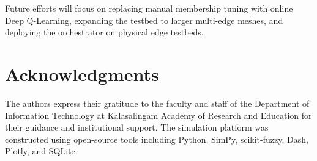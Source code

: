 \documentclass[conference]{IEEEtran}
\begin{document}
Future efforts will focus on replacing manual membership tuning with online Deep Q-Learning, expanding the testbed to larger multi-edge meshes, and deploying the orchestrator on physical edge testbeds.

\section*{Acknowledgments}
The authors express their gratitude to the faculty and staff of the Department of Information Technology at Kalasalingam Academy of Research and Education for their guidance and institutional support. The simulation platform was constructed using open-source tools including Python, SimPy, scikit-fuzzy, Dash, Plotly, and SQLite.


\end{document}
